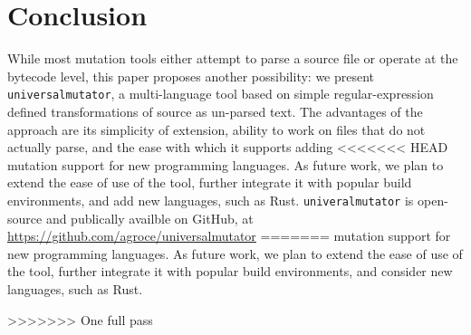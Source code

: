 \section{Conclusion}

While most mutation tools either attempt to parse a source file or
operate at the bytecode level, this paper proposes another
possibility:  we present {\tt universalmutator}, a multi-language tool based on simple regular-expression
defined transformations of source as un-parsed text.  The advantages
of the approach are its simplicity of extension, ability to work on files that do
not actually parse, and the ease with which it supports adding
<<<<<<< HEAD
mutation support for new programming languages.  As future work, we plan to extend the ease of use of the tool, further integrate it with popular build environments, and add new languages, such as Rust.
{\tt univeralmutator} is open-source and publically availble on GitHub, at \url{https://github.com/agroce/universalmutator}
=======
mutation support for new programming languages.  As future work, we plan to extend the ease of use of the tool, further integrate it with popular build environments, and consider new languages, such as Rust.

>>>>>>> One full pass

